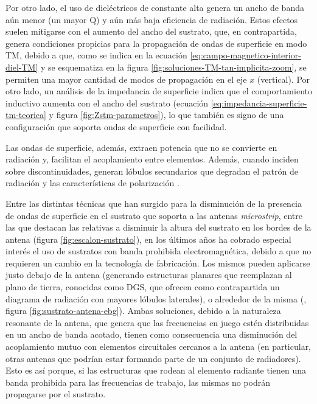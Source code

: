 Por otro lado, el uso de dieléctricos de constante alta genera un ancho de banda aún menor (un mayor Q) y aún más baja eficiencia de radiación. Estos efectos suelen mitigarse con el aumento del ancho del sustrato, que, en contrapartida, genera condiciones propicias para la propagación de ondas de superficie en modo TM, debido a que, como se indica en la ecuación \ref{eq:campo-magnetico-interior-diel-TM} y se esquematiza en la figura \ref{fig:soluciones-TM-tan-implicita-zoom}, se permiten una mayor cantidad de modos de propagación en el eje $x$ (vertical). Por otro lado, un análisis de la impedancia de superficie indica que el comportamiento inductivo aumenta con el ancho del sustrato (ecuación \ref{eq:impedancia-superficie-tm-teorica} y figura \ref{fig:Zstm-parametros}), lo que también es signo de una configuración que soporta ondas de superficie con facilidad.

Las ondas de superficie, además, extraen potencia que no se convierte en radiación y, facilitan el acoplamiento entre elementos. Además, cuando inciden sobre discontinuidades, generan lóbulos secundarios que degradan el patrón de radiación y las características de polarización \cite{Balanis:Theory}.

Entre las distintas técnicas que han surgido para la disminución de la presencia de ondas de superficie en el sustrato que soporta a las antenas \textit{microstrip}, entre las que destacan las relativas a disminuir la altura del sustrato en los bordes de la antena (figura \ref{fig:escalon-sustrato}), en los últimos años ha cobrado especial interés el uso de sustratos con banda prohibida electromagnética, debido a que no requieren un cambio en la tecnología de fabricación. Los mismos pueden aplicarse justo debajo de la antena (generando estructuras planares que reemplazan al plano de tierra, conocidas como DGS, que ofrecen como contrapartida un diagrama de radiación con mayores lóbulos laterales), o alrededor de la misma (\cite{Marcela:Tesis}, figura \ref{fig:sustrato-antena-ebg}). Ambas soluciones, debido a la naturaleza resonante de la antena, que genera que las frecuencias en juego estén distribuidas en un ancho de banda acotado, tienen como consecuencia una disminución del acoplamiento mutuo con elementos circuitales cercanos a la antena (en particular, otras antenas que podrían estar formando parte de un conjunto de radiadores). Esto es así porque, si las estructuras que rodean al elemento radiante tienen una banda prohibida para las frecuencias de trabajo, las mismas no podrán propagarse por el sustrato.


